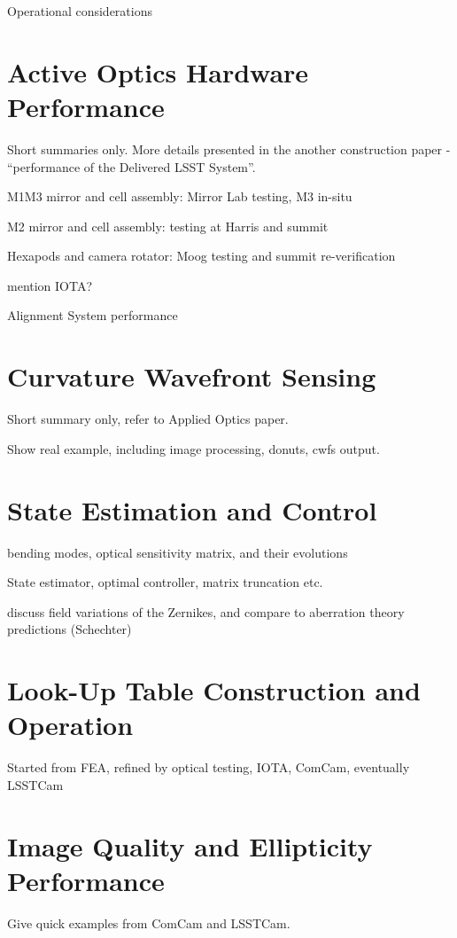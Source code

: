 Operational considerations

\section{Active Optics Hardware Performance}

Short summaries only. More details presented in the another construction paper - ``performance of the Delivered LSST System''.

M1M3 mirror and cell assembly: Mirror Lab testing, M3 in-situ

M2 mirror and cell assembly: testing at Harris and summit

Hexapods and camera rotator: Moog testing and summit re-verification

mention IOTA?

Alignment System performance

\section{Curvature Wavefront Sensing}

Short summary only, refer to Applied Optics paper.

Show real example, including image processing, donuts, cwfs output.

\section{State Estimation and Control}

bending modes, optical sensitivity matrix, and their evolutions

State estimator, optimal controller, matrix truncation etc.

discuss field variations of the Zernikes, and compare to aberration theory predictions (Schechter)

\section{Look-Up Table Construction and Operation}

Started from FEA, refined by optical testing, IOTA, ComCam, eventually LSSTCam

\section{Image Quality and Ellipticity Performance}

Give quick examples from ComCam and LSSTCam.

